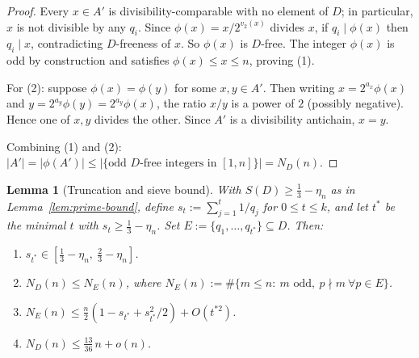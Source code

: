 \documentclass{article}
\newtheorem{lemma}{Lemma}
\begin{document}
\begin{proof}
Every $x \in A'$ is divisibility-comparable with no element of $D$; in particular, $x$ is not divisible by any $q_i$. Since $\phi(x) = x / 2^{v_2(x)}$ divides $x$, if $q_i \mid \phi(x)$ then $q_i \mid x$, contradicting $D$-freeness of $x$. So $\phi(x)$ is $D$-free. The integer $\phi(x)$ is odd by construction and satisfies $\phi(x) \le x \le n$, proving (1).

For (2): suppose $\phi(x) = \phi(y)$ for some $x, y \in A'$. Then writing $x = 2^{a_x} \phi(x)$ and $y = 2^{a_y} \phi(y) = 2^{a_y} \phi(x)$, the ratio $x/y$ is a power of $2$ (possibly negative). Hence one of $x, y$ divides the other. Since $A'$ is a divisibility antichain, $x = y$.

Combining (1) and (2): $|A'| = |\phi(A')| \le |\{\text{odd } D\text{-free integers in } [1, n]\}| = N_D(n)$.
\end{proof}

\begin{lemma}[Truncation and sieve bound]
\label{lem:truncation}
With $S(D) \ge \tfrac{1}{3} - \eta_n$ as in Lemma~\ref{lem:prime-bound}, define $s_t := \sum_{j=1}^{t} 1/q_j$ for $0 \le t \le k$, and let $t^*$ be the minimal $t$ with $s_t \ge \tfrac{1}{3} - \eta_n$. Set $E := \{q_1, \ldots, q_{t^*}\} \subseteq D$. Then:
\begin{enumerate}
  \item $s_{t^*} \in [\tfrac{1}{3} - \eta_n,\ \tfrac{2}{3} - \eta_n]$.
  \item $N_D(n) \le N_E(n)$, where $N_E(n) := \#\{m \le n :\ m \text{ odd},\ p \nmid m\ \forall p \in E\}$.
  \item $N_E(n) \le \tfrac{n}{2}(1 - s_{t^*} + s_{t^*}^2/2) + O(t^{*2})$.
  \item $N_D(n) \le \tfrac{13}{36}\, n + o(n)$.
\end{enumerate}
\end{lemma}
\end{document}
